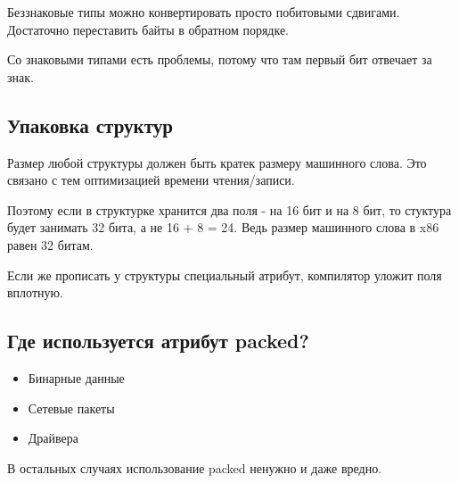 Беззнаковые типы можно конвертировать просто побитовыми сдвигами. Достаточно переставить байты в обратном порядке.

Со знаковыми типами есть проблемы, потому что там первый бит отвечает за знак.

\subsection{Упаковка структур}

Размер любой структуры должен быть кратек размеру машинного слова. Это связано с тем оптимизацией времени чтения/записи. 

Поэтому если в структурке хранится два поля - на 16 бит и на 8 бит, то стуктура будет занимать 32 бита, а не 16 + 8 = 24. Ведь размер машинного слова в x86 равен 32 битам.

Если же прописать у структуры специальный атрибут, компилятор уложит поля вплотную.

\subsection{Где используется атрибут packed?}

\begin{itemize}
	\item Бинарные данные
	\item Сетевые пакеты
	\item Драйвера
\end{itemize}

В остальных случаях использование packed ненужно и даже вредно.
